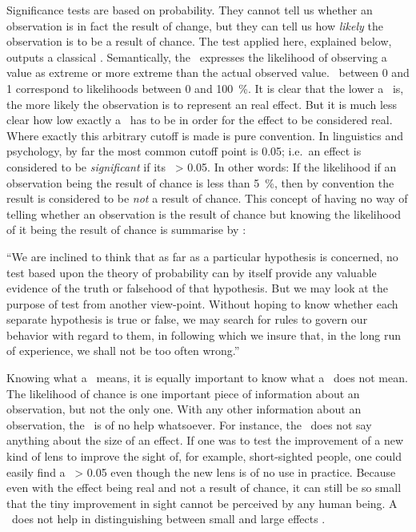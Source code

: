 Significance tests are based on probability.
They cannot tell us whether an observation is in fact the result of change, but they can tell us how \emph{likely} the observation is to be a result of chance.
The test applied here, explained below, outputs a classical \pv.
Semantically, the \pv\ expresses the likelihood of observing a value as extreme or more extreme than the actual observed value.
\pv\ between 0 and 1 correspond to likelihoods between 0 and 100~\%.
It is clear that the lower a \pv\ is, the more likely the observation is to represent an real effect.
But it is much less clear how low exactly a \pv\ has to be in order for the effect to be considered real.
Where exactly this arbitrary cutoff is made is pure convention.
In linguistics and psychology, by far the most common cutoff point is 0.05; i.e.~an effect is considered to be \emph{significant} if its \pv\ > 0.05.
In other words:
If the likelihood if an observation being the result of chance is less than 5~\%, then by convention the result is considered to be \emph{not} a result of chance.
This concept of having no way of telling whether an observation is the result of chance but knowing the likelihood of it being the result of chance is summarise by \citet[]{neyman_problem_1933}:

\begin{customquote}
``We are inclined to think that as far as a particular hypothesis is concerned, no test based upon the theory of probability can by itself provide any valuable evidence of the truth or falsehood of that hypothesis.
But we may look at the purpose of test from another view-point.
Without hoping to know whether each separate hypothesis is true or false, we may search for rules to govern our behavior with regard to them, in following which we insure that, in the long run of experience, we shall not be too often wrong.''
\end{customquote}

Knowing what a \pv\ means, it is equally important to know what a \pv\ does not mean.
The likelihood of chance is one important piece of information about an observation, but not the only one.
With any other information about an observation, the \pv\ is of no help whatsoever.
For instance, the \pv\ does not say anything about the size of an effect.
If one was to test the improvement of a new kind of lens to improve the sight of, for example, short-sighted people, one could easily find a \pv\ > 0.05 even though the new lens is of no use in practice.
Because even with the effect being real and not a result of chance, it can still be so small that the tiny improvement in sight cannot be perceived by any human being.
A \pv\ does not help in distinguishing between small and large effects \citep[]{frost_statistische_2017}.

